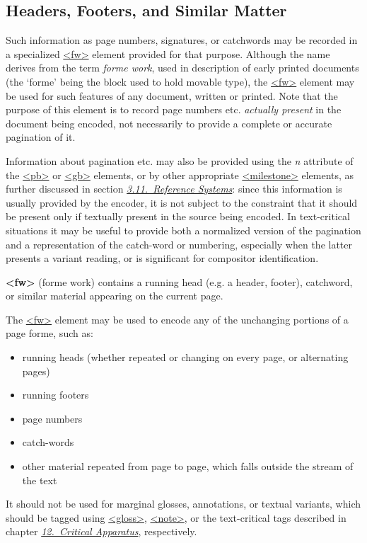 \subsection[{Headers, Footers, and Similar Matter}]{Headers, Footers, and Similar Matter}\label{PHSK}\par
Such information as page numbers, signatures, or catchwords may be recorded in a specialized \hyperref[TEI.fw]{<fw>} element provided for that purpose. Although the name derives from the term \textit{forme work}, used in description of early printed documents (the ‘forme’ being the block used to hold movable type), the \hyperref[TEI.fw]{<fw>} element may be used for such features of any document, written or printed. Note that the purpose of this element is to record page numbers etc. \textit{actually present} in the document being encoded, not necessarily to provide a complete or accurate pagination of it.\par
Information about pagination etc. may also be provided using the {\itshape n} attribute of the \hyperref[TEI.pb]{<pb>} or \hyperref[TEI.gb]{<gb>} elements, or by other appropriate \hyperref[TEI.milestone]{<milestone>} elements, as further discussed in section \textit{\hyperref[CORS]{3.11.\ Reference Systems}}: since this information is usually provided by the encoder, it is not subject to the constraint that it should be present only if textually present in the source being encoded. In text-critical situations it may be useful to provide both a normalized version of the pagination and a representation of the catch-word or numbering, especially when the latter presents a variant reading, or is significant for compositor identification. 
\begin{sansreflist}
  
\item [\textbf{<fw>}] (forme work) contains a running head (e.g. a header, footer), catchword, or similar material appearing on the current page.
\end{sansreflist}
 The \hyperref[TEI.fw]{<fw>} element may be used to encode any of the unchanging portions of a page forme, such as: \begin{itemize}
\item running heads (whether repeated or changing on every page, or alternating pages)
\item running footers
\item page numbers
\item catch-words
\item other material repeated from page to page, which falls outside the stream of the text
\end{itemize}  It should not be used for marginal glosses, annotations, or textual variants, which should be tagged using \hyperref[TEI.gloss]{<gloss>}, \hyperref[TEI.note]{<note>}, or the text-critical tags described in chapter \textit{\hyperref[TC]{12.\ Critical Apparatus}}, respectively.\par
